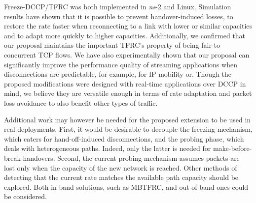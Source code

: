 \documentclass[twocolumn]{nictatechreport}
\newcommand{\ns}{\textit{ns}}
\begin{document}
Freeze-DCCP/TFRC was both implemented in \ns-2 and Linux. Simulation results
have shown that it is possible to prevent handover-induced losses, to restore
the rate faster when reconnecting to a link with lower or similar capacities and
to adapt more quickly to higher capacities.  Additionally, we confirmed that our
proposal maintains the important TFRC's property of being fair to concurrent TCP
flows.  We have also experimentally shown that our proposal can significantly
improve the performance quality of streaming applications when disconnections
are predictable, for example, for IP mobility or.  Though the proposed
modifications were designed with real-time applications over DCCP in mind, we
believe they are versatile enough in terms of rate adaptation and packet loss
avoidance to also benefit other types of traffic.

Additional work may however be needed for the proposed extension to be used in
real deployments.  First, it would be desirable to decouple the freezing
mechanism, which caters for hand-off-induced disconnections, and the probing
phase, which deals with heterogeneous paths. Indeed, only the latter is needed
for make-before-break handovers. Second, the current probing mechanism assumes
packets are lost only when the capacity of the new network is reached.  Other
methods of detecting that the current rate matches the available path capacity
should be explored.  Both in-band solutions, such as MBTFRC, and out-of-band
ones could be considered.

\printbibliography 
\end{document}
